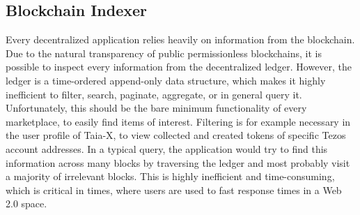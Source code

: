             
            
\subsection{Blockchain Indexer}
\label{subsec:indexer}
            
Every decentralized application relies heavily on information from the blockchain. Due to the natural transparency of public permissionless blockchains, it is possible to inspect every information from the decentralized ledger. However, the ledger is a time-ordered append-only data structure, which makes it highly inefficient to filter, search, paginate, aggregate, or in general query it. Unfortunately, this should be the bare minimum functionality of every marketplace, to easily find items of interest. Filtering is for example necessary in the user profile of Taia-X, to view collected and created tokens of specific Tezos account addresses. In a typical query, the application would try to find this information across many blocks by traversing the ledger and most probably visit a majority of irrelevant blocks. This is highly inefficient and time-consuming, which is critical in times, where users are used to fast response times in a Web 2.0 space.
            
